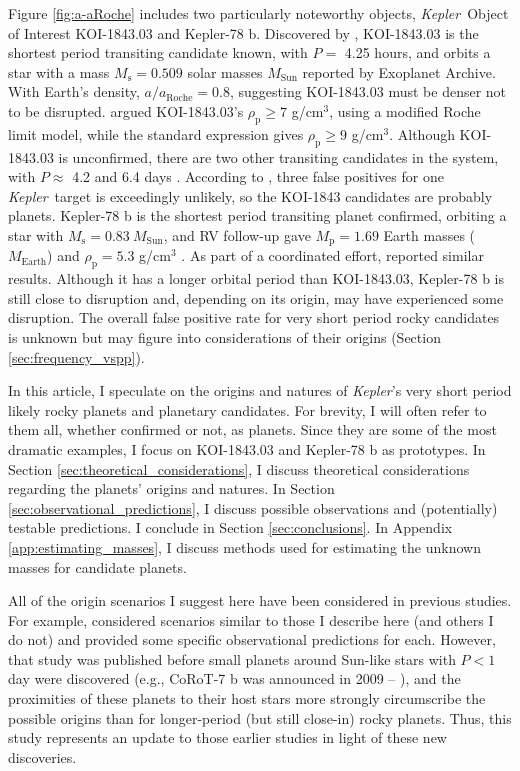 \documentclass[smallcondensed]{svjour3}    %
\newcommand{\kepler}{\emph{Kepler}}
\begin{document}
Figure \ref{fig:a-aRoche} includes two particularly noteworthy objects, \kepler~Object of Interest KOI-1843.03 and Kepler-78 b. Discovered by \cite{2013A&A...555A..58O}, KOI-1843.03 is the shortest period transiting candidate known, with $P =$ 4.25 hours, and orbits a star with a mass $M_\mathrm{s} = 0.509$ solar masses $M_\mathrm{Sun}$ reported by Exoplanet Archive. With Earth's density, $a/a_\mathrm{Roche} = 0.8$, suggesting KOI-1843.03 must be denser not to be disrupted. \cite{2013ApJ...773L..15R} argued KOI-1843.03's $\rho_\mathrm{p} \ge 7$ g/cm$^3$, using a modified Roche limit model, while the standard expression gives $\rho_\mathrm{p} \ge 9$ g/cm$^3$. Although KOI-1843.03 is unconfirmed, there are two other transiting candidates in the system, with $P \approx$ 4.2 and 6.4 days \cite{2013ApJS..204...24B}. According to \cite{2012ApJ...750..112L}, three false positives for one \kepler~target is exceedingly unlikely, so the KOI-1843 candidates are probably planets. Kepler-78 b is the shortest period transiting planet confirmed, orbiting a star with $M_\mathrm{s} = 0.83\ M_\mathrm{Sun}$, and RV follow-up gave $M_\mathrm{p} = 1.69$ Earth masses ($M_\mathrm{Earth}$) and $\rho_\mathrm{p} = 5.3$ g/cm$^3$ \cite{2013Natur.503..381H}. As part of a coordinated effort, \cite{2013Natur.503..377P} reported similar results. Although it has a longer orbital period than KOI-1843.03, Kepler-78 b is still close to disruption and, depending on its origin, may have experienced some disruption. The overall false positive rate for very short period rocky candidates is unknown but may figure into considerations of their origins (Section \ref{sec:frequency_vspp}).

In this article, I speculate on the origins and natures of \kepler's very short period likely rocky planets and planetary candidates. For brevity, I will often refer to them all, whether confirmed or not, as planets. Since they are some of the most dramatic examples, I focus on KOI-1843.03 and Kepler-78 b as prototypes. In Section \ref{sec:theoretical_considerations}, I discuss theoretical considerations regarding the planets' origins and natures. In Section \ref{sec:observational_predictions}, I discuss possible observations and (potentially) testable predictions. I conclude in Section \ref{sec:conclusions}. In Appendix \ref{app:estimating_masses}, I discuss methods used for estimating the unknown masses for candidate planets.

All of the origin scenarios I suggest here have been considered in previous studies. For example, \cite{2008MNRAS.384..663R} considered scenarios similar to those I describe here (and others I do not) and provided some specific observational predictions for each. However, that study was published before small planets around Sun-like stars with $P < 1$ day were discovered (e.g., CoRoT-7 b was announced in 2009 -- \cite{2009A&A...506..287L}), and the proximities of these planets to their host stars more strongly circumscribe the possible origins than for longer-period (but still close-in) rocky planets. Thus, this study represents an update to those earlier studies in light of these new discoveries.



\end{document}
